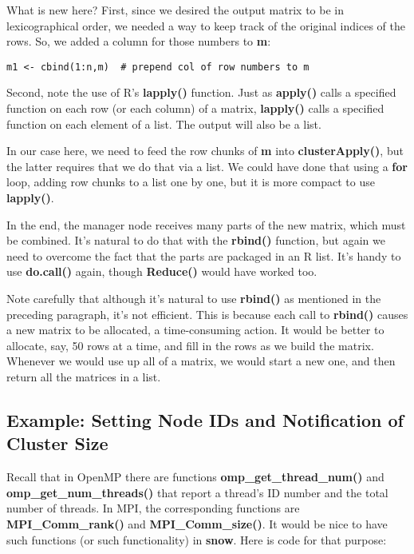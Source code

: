 What is new here?  First, since we desired the output matrix to be in
lexicographical order, we needed a way to keep track of the original
indices of the rows.  So, we added a column for those numbers to {\bf
m}:

\begin{lstlisting}
m1 <- cbind(1:n,m)  # prepend col of row numbers to m
\end{lstlisting}

Second, note the use of R's {\bf lapply()} function.  Just as {\bf
apply()} calls a specified function on each row (or each column) of a
matrix, {\bf lapply()} calls a specified function on each element of a
list.  The output will also be a list.

In our case here, we need to feed the row chunks of {\bf m} into {\bf
clusterApply()}, but the latter requires that we do that via a list.
We could have done that using a {\bf for} loop, adding row chunks to a
list one by one, but it is more compact to use {\bf lapply()}.

In the end, the manager node receives many parts of the new matrix,
which must be combined.  It's natural to do that with the {\bf rbind()}
function, but again we need to overcome the fact that the parts are
packaged in an R list.  It's handy to use {\bf do.call()} again, though
{\bf Reduce()} would have worked too.

Note carefully that although it's natural to use {\bf rbind()} as
mentioned in the preceding paragraph, it's not efficient.  This is
because each call to {\bf rbind()} causes a new matrix to be allocated,
a time-consuming action.  It would be better to allocate, say, 50 rows
at a time, and fill in the rows as we build the matrix.  Whenever we
would use up all of a matrix, we would start a new one, and then return
all the matrices in a list.

\subsection{Example:  Setting Node IDs and Notification of Cluster Size}

Recall that in OpenMP there are functions {\bf omp\_get\_thread\_num()}
and {\bf omp\_get\_num\_threads()} that report a thread's ID number and
the total number of threads.  In MPI, the corresponding functions are
{\bf MPI\_Comm\_rank()} and {\bf MPI\_Comm\_size()}.  It would be nice
to have such functions (or such functionality) in {\bf snow}.  Here is
code for that purpose:

